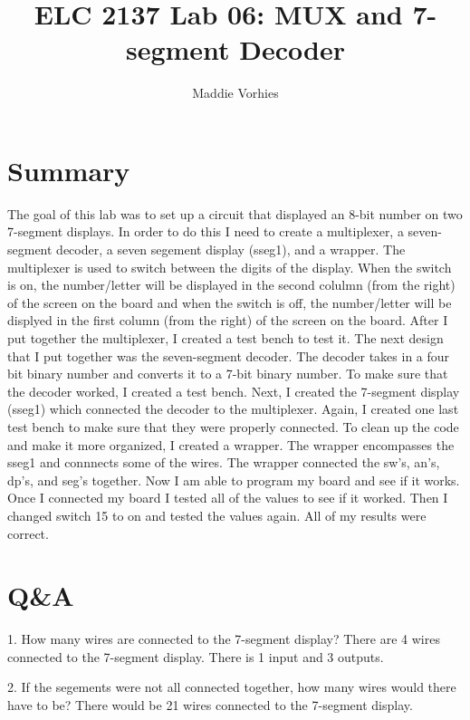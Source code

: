 \documentclass[11pt]{article}
\begin{document}
\title{ELC 2137 Lab 06: MUX and 7-segment Decoder}
\author{Maddie Vorhies}

\maketitle


\section*{Summary}

The goal of this lab was to set up a circuit that displayed an 8-bit number on two 7-segment displays. In order to do this I need to create a multiplexer, a seven-segment decoder, a seven segement display (sseg1), and a wrapper. The multiplexer is used to switch between the digits of the display. When the switch is on, the number/letter will be displayed in the second colulmn (from the right) of the screen on the board and when the switch is off, the number/letter will be displyed in the first column (from the right) of the screen on the board. After I put together the multiplexer, I created a test bench to test it. The next design that I put together was the seven-segment decoder. The decoder takes in a four bit binary number and converts it to a 7-bit binary number. To make sure that the decoder worked, I created a test bench. Next, I created the 7-segment display (sseg1) which connected the decoder to the multiplexer. Again, I created one last test bench to make sure that they were properly connected. To clean up the code and make it more organized, I created a wrapper. The wrapper encompasses the sseg1 and connnects some of the wires. The wrapper connected the sw's, an's, dp's, and seg's together. Now I am able to program my board and see if it works. Once I connected my board I tested all of the values to see if it worked. Then I changed switch 15 to on and tested the values again. All of my results were correct. 


\section*{Q\&A}

1. How many wires are connected to the 7-segment display? \newline
There are 4 wires connected to the 7-segment display. There is 1 input and 3 outputs. \newline


2. If the segements were not all connected together, how many wires would there have to be? \newline
There would be 21 wires connected to the 7-segment display. \newline
\end{document}

